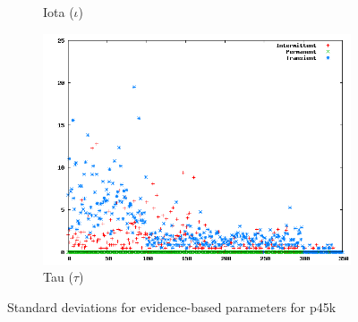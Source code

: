\begin{figure}
\begin{subfigure}[h]{0.45\linewidth}
                \caption{Iota ($\iota$)}
        \end{subfigure}
			\begin{subfigure}[h]{0.45\linewidth}
                \includegraphics[scale=0.32]{figures/sdtaup45k.png}
                \caption{Tau ($\tau$)}
        \end{subfigure}
        \caption{Standard deviations for evidence-based parameters for p45k}
        \label{fig:sdevidance} 
\end{figure}


